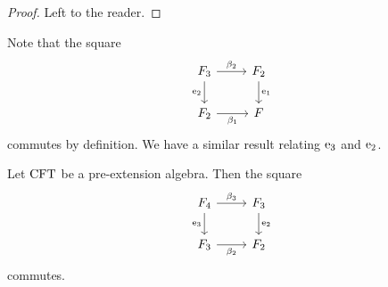 \begin{proof}
Left to the reader.
\end{proof}

\begin{comment}
\begin{proof}
It is straightforward to verify the equalities
\begin{align*}
\pullbackpr{1}{\ectxext}{\eft}\circ\beta_2\circ
  (\pullback{\pullbackpr{2}{\efamext}{\eft[2]}}{\pullbackpr{2}{\efamext}{\eft[2]}}{\efamext}{\eft[2]})
  & =
\pullbackpr{1}{\ectxext}{\eft}\circ\beta_2\circ\beta_3
  \\
\pullbackpr{2}{\ectxext}{\eft}\circ\beta_2\circ
  (\pullback{\pullbackpr{2}{\efamext}{\eft[2]}}{\pullbackpr{2}{\efamext}{\eft[2]}}{\efamext}{\eft[2]})
  & =
\pullbackpr{2}{\ectxext}{\eft}\circ\beta_2\circ\beta_3.\qedhere
\end{align*}
\end{proof}
\end{comment}

Note that the square
\begin{equation*}
\begin{tikzcd}
\stesysf_3
  \ar{r}{\beta_2}
  \ar{d}[swap]{\eext{2}}
  &
\stesysf_2
  \ar{d}{\efamext}
  \\
\stesysf_2
  \ar{r}[swap]{\beta_1}
  &
\stesysf
\end{tikzcd}
\end{equation*}
commutes by definition. We have a similar result relating $\mathrm{e}_{3}$ and
$\mathrm{e}_{2}$.

\begin{lem}
Let $\mathrm{CFT}$ be a pre-extension algebra. Then the square
\begin{equation*}
\begin{tikzcd}
\stesysf_4
  \ar{r}{\beta_3}
  \ar{d}[swap]{\eext{3}}
  &
\stesysf_3
  \ar{d}{\eext{2}}
  \\
\stesysf_3
  \ar{r}[swap]{\beta_2}
  &
\stesysf_2
\end{tikzcd}
\end{equation*}
commutes.
\end{lem}

